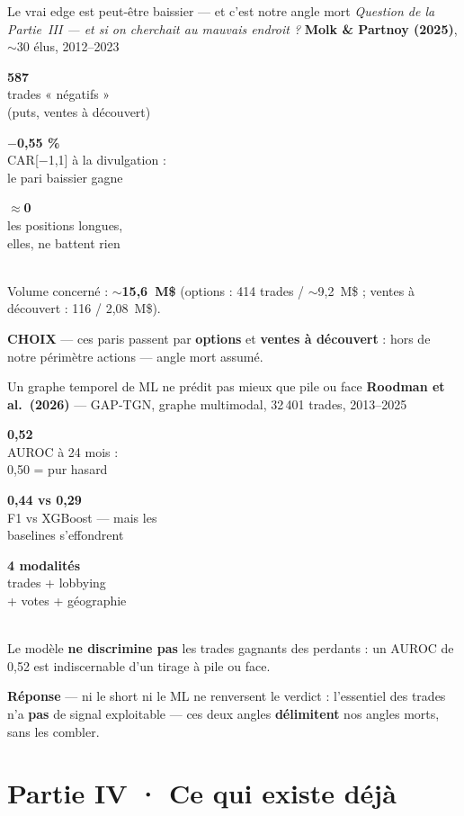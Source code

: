 \documentclass[11pt,aspectratio=169]{beamer}
\newcommand{\tuile}[3]{%
  \begin{minipage}[t]{0.23\textwidth}\centering
    \colorbox{#1}{\parbox[c][21mm][c]{\dimexpr\linewidth-8pt}{\centering
      {\color{white}\Large\textbf{#2}}\\[0.6mm]
      {\color{white}\footnotesize #3}}}
  \end{minipage}}
\newcommand{\choixbox}[1]{%
  \colorbox{alertred!8}{\parbox{\dimexpr\linewidth-8pt}{\scriptsize
    \textbf{\textcolor{alertred}{CHOIX}}\; --- #1}}}
\newcommand{\repband}[1]{%
  \colorbox{okgreen!12}{\parbox{\dimexpr\textwidth-10pt}{\scriptsize
    \textbf{\textcolor{okgreen}{Réponse}}\; --- #1}}}
\begin{document}
\begin{frame}{Le vrai edge est peut-être baissier --- et c'est notre angle mort}
  \centering
  {\footnotesize\textit{Question de la Partie~III --- et si on cherchait au mauvais endroit ?}\quad
   \textbf{Molk \& Partnoy (2025)}, $\sim$30 élus, 2012--2023}\\[4mm]
  \tuile{helec}{587}{trades « négatifs »\\(puts, ventes à découvert)}\hfill
  \tuile{alertred}{$-$0,55 \%}{CAR[$-$1,1] à la divulgation :\\le pari baissier gagne}\hfill
  \tuile{grisC}{$\approx$0}{les positions longues,\\elles, ne battent rien}\\[5mm]
  {\footnotesize Volume concerné : \textbf{$\sim$15,6~M\$} (options : 414 trades / $\sim$9,2~M\$ ;
   ventes à découvert : 116 / 2,08~M\$).}\\[3mm]
  \choixbox{ces paris passent par \textbf{options} et \textbf{ventes à découvert} : hors de notre
   périmètre actions --- angle mort assumé.}
\end{frame}

\begin{frame}{Un graphe temporel de ML ne prédit pas mieux que pile ou face}
  \centering
  {\footnotesize\textbf{Roodman et al.\ (2026)} --- GAP-TGN, graphe multimodal, 32\,401 trades, 2013--2025}\\[4mm]
  \tuile{alertred}{0,52}{AUROC à 24 mois :\\0,50 = pur hasard}\hfill
  \tuile{grisC}{0,44 vs 0,29}{F1 vs XGBoost --- mais les\\baselines s'effondrent}\hfill
  \tuile{helec}{4 modalités}{trades + lobbying\\+ votes + géographie}\\[5mm]
  {\footnotesize Le modèle \textbf{ne discrimine pas} les trades gagnants des perdants : un AUROC de 0,52
   est indiscernable d'un tirage à pile ou face.}\\[3.5mm]
  \repband{ni le short ni le ML ne renversent le verdict : l'essentiel des trades n'a \textbf{pas} de
   signal exploitable --- ces deux angles \textbf{délimitent} nos angles morts, sans les combler.}
\end{frame}

\section{Partie IV · Ce qui existe déjà}
\end{document}
